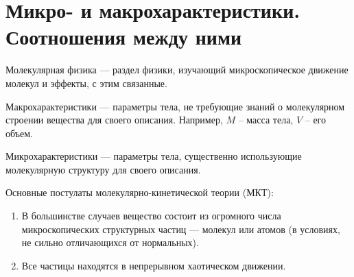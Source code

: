 \section{Микро- и макрохарактеристики. Соотношения между ними}

Молекулярная физика --- раздел физики, изучающий микроскопическое движение молекул и эффекты, с этим связанные. \par
Макрохарактеристики --- параметры тела, не требующие знаний о молекулярном строении вещества для своего описания. Например, $M$ -- масса тела, $V$ -- его объем. \par
Микрохарактеристики --- параметры тела, существенно использующие молекулярную структуру для своего описания. \par
Основные постулаты молекулярно-кинетической теории (МКТ):
\begin{enumerate}
	\item В большинстве случаев вещество состоит из огромного числа микроскопических структурных частиц --- молекул или атомов (в условиях, не сильно отличающихся от нормальных).
	\item Все частицы находятся в непрерывном хаотическом движении.
\end{enumerate}

